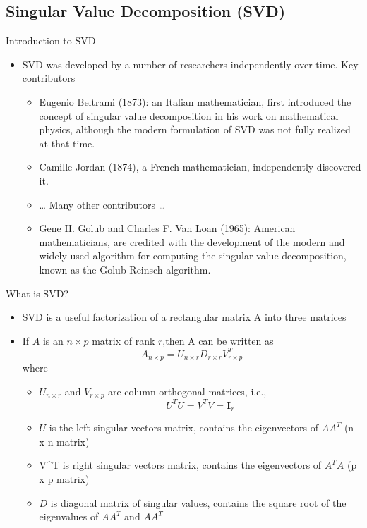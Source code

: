 \documentclass[
  ignorenonframetext,
]{beamer}
\providecommand{\tightlist}{%
  \setlength{\itemsep}{0pt}\setlength{\parskip}{0pt}}
\begin{document}
\hypertarget{singular-value-decomposition-svd}{%
\subsection{Singular Value Decomposition
(SVD)}\label{singular-value-decomposition-svd}}

\begin{frame}{Introduction to SVD}
\protect\hypertarget{introduction-to-svd}{}
\begin{itemize}
\tightlist
\item
  SVD was developed by a number of researchers independently over time.
  Key contributors

  \begin{itemize}
  \item
    Eugenio Beltrami (1873): an Italian mathematician, first introduced
    the concept of singular value decomposition in his work on
    mathematical physics, although the modern formulation of SVD was not
    fully realized at that time.
  \item
    Camille Jordan (1874), a French mathematician, independently
    discovered it.
  \item
    \ldots{} Many other contributors \ldots{}
  \item
    Gene H. Golub and Charles F. Van Loan (1965): American
    mathematicians, are credited with the development of the modern and
    widely used algorithm for computing the singular value
    decomposition, known as the Golub-Reinsch algorithm.
  \end{itemize}
\end{itemize}
\end{frame}

\begin{frame}{What is SVD?}
\protect\hypertarget{what-is-svd}{}
\begin{itemize}
\tightlist
\item
  SVD is a useful factorization of a rectangular matrix A into three
  matrices
\item
  If \(A\) is an \(n\times p\) matrix of rank \(r\),then A can be
  written as
  \[A_{n\times p} = U_{n\times r} D_{r\times r} V_{r\times p}^T\] where

  \begin{itemize}
  \tightlist
  \item
    \(U_{n\times r}\) and \(V_{r\times p}\) are column orthogonal
    matrices, i.e., \[U^TU=V^TV=\mathbf I_{r}\]
  \item
    \(U\) is the left singular vectors matrix, contains the eigenvectors
    of \(AA^T\) (n x n matrix)
  \item
    V\^{}T is right singular vectors matrix, contains the eigenvectors
    of \(A^TA\) (p x p matrix)
  \item
    \(D\) is diagonal matrix of singular values, contains the square
    root of the eigenvalues of \(AA^T\) and \(AA^T\)
  \end{itemize}
\end{itemize}
\end{frame}
\end{document}
